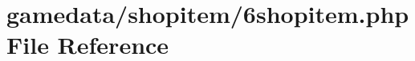 \hypertarget{6shopitem_8php}{\section{gamedata/shopitem/6shopitem.php File Reference}
\label{6shopitem_8php}
}
